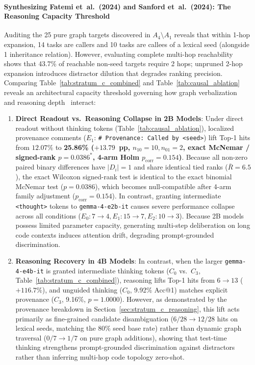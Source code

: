 \documentclass[10pt]{article}
\begin{document}
\paragraph{Synthesizing Fatemi et~al.\ (2024) and Sanford et~al.\ (2024): The Reasoning Capacity Threshold}
Auditing the 25 pure graph targets discovered in $A_4 \setminus A_1$ reveals that within 1-hop expansion, 14 tasks are callers and 10 tasks are callees of a lexical seed (alongside 1 inheritance relation). However, evaluating complete multi-hop reachability shows that 43.7\% of reachable non-seed targets require 2 hops; unpruned 2-hop expansion introduces distractor dilution that degrades ranking precision. Comparing Table~\ref{tab:stratum_c_combined} and Table~\ref{tab:causal_ablation} reveals an architectural capacity threshold governing how graph verbalization~\cite{fatemi2023talk} and reasoning depth~\cite{sanford2024understanding} interact:
\begin{enumerate}[noitemsep,topsep=1pt,parsep=0pt,partopsep=0pt]
    \item \textbf{Direct Readout vs.\ Reasoning Collapse in 2B Models}: Under direct readout without thinking tokens (Table~\ref{tab:causal_ablation}), localized provenance comments ($E_1$: \texttt{\# Provenance: Called by <seed>}) lift Top-1 hits from $12.07\%$ to \textbf{25.86\% ($+13.79$~pp, $n_{10}=10, n_{01}=2$, exact McNemar / signed-rank $p=0.0386^*$, 4-arm Holm $p_{\text{corr}} = 0.154$)}. Because all non-zero paired binary differences have $|D_i|=1$ and share identical tied ranks ($\bar{R}=6.5$), the exact Wilcoxon signed-rank test is identical to the exact binomial McNemar test ($p=0.0386$), which becomes null-compatible after 4-arm family adjustment ($p_{\text{corr}}=0.154$). In contrast, granting intermediate \texttt{<thought>} tokens to \texttt{gemma-4-e2b-it} causes severe performance collapse across all conditions ($E_0: 7 \to 4, E_1: 15 \to 7, E_2: 10 \to 3$). Because 2B models possess limited parameter capacity, generating multi-step deliberation on long code contexts induces attention drift, degrading prompt-grounded discrimination.
    \item \textbf{Reasoning Recovery in 4B Models}: In contrast, when the larger \texttt{gemma-4-e4b-it} is granted intermediate thinking tokens ($C_0$ vs.\ $C_3$, Table~\ref{tab:stratum_c_combined}), reasoning lifts Top-1 hits from $6 \to 13$ ($+116.7\%$), and unguided thinking ($C_0$, 9.92\% Acc@1) matches explicit provenance ($C_3$, 9.16\%, $p=1.0000$). However, as demonstrated by the provenance breakdown in Section~\ref{sec:stratum_c_reasoning}, this lift acts primarily as fine-grained candidate disambiguation ($6/28 \to 12/28$ hits on lexical seeds, matching the 80\% seed base rate) rather than dynamic graph traversal ($0/7 \to 1/7$ on pure graph additions), showing that test-time thinking strengthens prompt-grounded discrimination against distractors rather than inferring multi-hop code topology zero-shot.
\end{enumerate}
\end{document}
